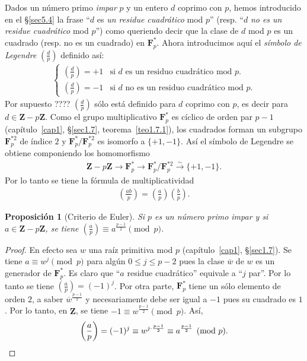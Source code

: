 \documentclass[oneside,bibtotoc,leqno,spanish]{amsbook}
\newcommand{\ZZ}{\mathbf{Z}}
\newcommand{\FF}{\mathbf{F}}
\newcommand{\oline}[1]{\overline{#1}}
\renewcommand{\to}[1][]{\xrightarrow{#1}}
\newcommand{\leg}[2]{\left(\frac{#1}{#2}\right)}
\numberwithin{equation}{section}
\theoremstyle{defi}
\theoremstyle{note}
\newtheorem{proposition}{Proposici\'on}
\theoremstyle{rem}
\numberwithin{theorem}{section}
\numberwithin{proposition}{section}
\numberwithin{definition}{section}
\numberwithin{lemma}{section}
\numberwithin{corollary}{section}
\numberwithin{example}{section}
\numberwithin{footnote}{section}%
\begin{document}
Dados un n\'umero primo {\em impar} $p$ y un entero $d$ coprimo con $p$, hemos introducido en el \S\ref{sec5.4}
la frase ``$d$ es {\em un residue cuadr\'atico} mod $p$'' (resp. ``$d$ {\em no es un residue cuadr\'atico}
mod $p$'') como queriendo decir que la clase de $d$ mod $p$ es un cuadrado (resp. no es un cuadrado) en
$\FF_{p}^{*}$. Ahora introducimos aqu\'i el {\em s\'imbolo de Legendre} $\left(\frac{d}{p}\right)$ definido
as\'i:
\begin{gather}
\begin{cases}
\left(\frac{d}{p}\right) = +1  & \text{si $d$ es un residuo cuadr\'atico mod $p$.}\\
\left(\frac{d}{p}\right) = -1 & \text{si $d$ no es un residuo cuadr\'atico mod $p$.}
\end{cases}
\end{gather}
Por supuesto ???? $\leg{d}{p}$ s\'olo est\'a definido para $d$ coprimo con $p$, es decir para
$d\in\ZZ-p\ZZ$. Como el grupo multiplicativo $\FF_{p}^{*}$ es c\'iclico de orden par $p-1$
(cap\'itulo~\ref{cap1}, \S\ref{sec1.7}, teorema~\ref{teo1.7.1}), los cuadrados forman un subgrupo $\FF_{p}^{*2}$ de \'indice $2$ y
$\FF_{p}^{*}/\FF_{p}^{*2}$ es isomorfo a $\{+1,-1\}$. As\'i el s\'imbolo de Legendre se obtiene componiendo
los homomorfismo
\begin{gather*}
\ZZ-p\ZZ\to\FF_{p}^{*}\to\FF_{p}^{*}/\FF_{p}^{*2}\to[\sim]\{+1,-1\}.
\end{gather*}
Por lo tanto se tiene la f\'ormula de multiplicatividad
\begin{gather}\label{eq-5.5-2}
\leg{ab}{p} = \leg{a}{p}\leg{b}{p}.
\end{gather}

\begin{proposition}[Criterio de Euler]\label{prop5.5.1}
Si $p$ es un n\'umero primo impar y si $a\in\ZZ-p\ZZ$, se tiene $\leg{a}{p}\equiv a^{\frac{p-1}{2}}\pmod p$.
\end{proposition}

\begin{proof}
En efecto sea $w$ una ra\'iz primitiva mod $p$ (cap\'itulo~\ref{cap1}, \S\ref{sec1.7}). Se tiene
$a\equiv w^{j}\pmod p$ para alg\'un $0\leq j\leq p-2$ pues la clase $\oline w$ de $w$ es un generador
de $\FF_{p}^{*}$. Es claro que ``$a$ residue cuadr\'atico'' equivale a ``$j$ par''. Por lo tanto se tiene
$\leg{a}{p}=(-1)^{j}$. Por otra parte, $\FF_{p}^{*}$ tiene un s\'olo elemento de orden $2$, a saber
$\oline w^{\frac{p-1}{2}}$ y necesariamente debe ser igual a $-1$ pues su cuadrado es $1$. Por lo tanto,
en $\ZZ$, se tiene $-1\equiv w^{\frac{p-1}{2}}\pmod p$. As\'i,
\begin{gather*}
\leg{a}{p}=(-1)^{j}\equiv w^{j\cdot\frac{p-1}{2}}\equiv a^{\frac{p-1}{2}}\pmod p.\qedhere
\end{gather*}
\end{proof}
\end{document}
